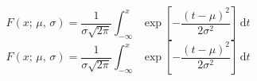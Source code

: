 \documentclass{article}
\begin{document}
\[
    F(x; \, \mu, \, \sigma)
  = \frac{1}{\sigma\sqrt{2\pi}} \int_{-\infty}^x
    \exp \left[ -\frac{(t-\mu)^2}{2\sigma^2} \right] \, \mathrm{d}t
\]
\[
    F(x; \, μ, \, σ)
  = \frac{1}{σ \sqrt{2π}} ∫_{-∞}^x
    \exp \left[ -\frac{(t-μ)^2}{2σ^2} \right] \, \mathrm{d} t
\]
\end{document}
